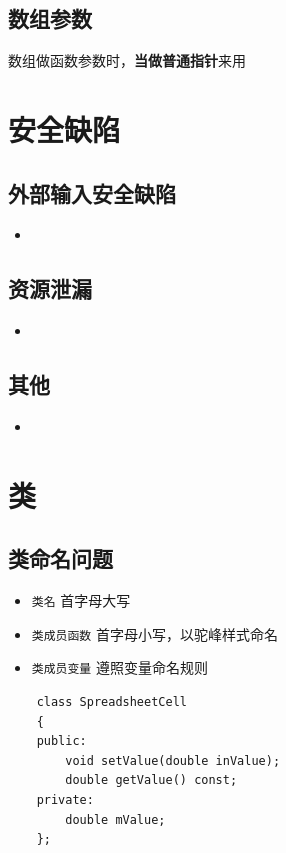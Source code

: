 \documentclass[UTF8,a4paper,12pt]{ctexbook} %
\begin{document}
		\subsection{数组参数}
			数组做函数参数时，\textbf{当做普通指针}来用
			
\section{安全缺陷}
		\subsection{外部输入安全缺陷}
			\begin{itemize}
				\item 
			\end{itemize}
		\subsection{资源泄漏}
			\begin{itemize}
				\item 
			\end{itemize}
		\subsection{其他}
			\begin{itemize}
				\item 
			\end{itemize}
		
\section{类}
	\subsection{类命名问题}
		\begin{itemize}
			\item  \verb|类名| 首字母大写
			\item  \verb|类成员函数| 首字母小写，以驼峰样式命名
			\item  \verb|类成员变量| 遵照变量命名规则
		\end{itemize}
		
		\begin{lstlisting}
	class SpreadsheetCell
	{
	public:
		void setValue(double inValue);
		double getValue() const;
	private:
		double mValue;
	};
		\end{lstlisting}
\end{document}
